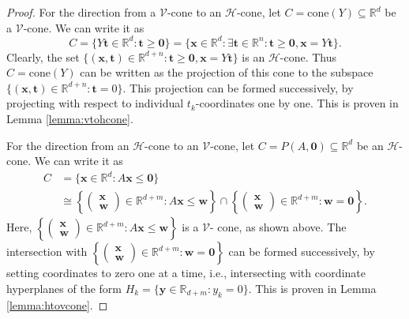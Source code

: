 		\begin{proof} 
			For the direction from a $\mathcal{V}$-cone to an $\mathcal{H}$-cone, 
			let $C = \text{cone} (Y) \subseteq \mathbb{R}^d$ be a $\mathcal{V}$-cone. 
			We can write it as 
			\[
				C = \{Y \boldsymbol{t} \in \mathbb{R}^d : \boldsymbol{t} \geq \boldsymbol{0} \}
				= \{ \boldsymbol{x} \in \mathbb{R}^d : \exists \boldsymbol{t} \in \mathbb{R}^n : 
				\boldsymbol{t} \geq \boldsymbol{0}, \boldsymbol{x} = Y\boldsymbol{t} \}.
			\]
			Clearly, the set $\{(\boldsymbol{x},\boldsymbol{t}) \in \mathbb{R}^{d+n} : 
			\boldsymbol{t} \geq \boldsymbol{0}, \boldsymbol{x} = Y\boldsymbol{t} \}$ is an 
			$\mathcal{H}$-cone. Thus $C = \text{cone}(Y)$ can be written as the projection 
			of this cone to the subspace $\{(\boldsymbol{x},\boldsymbol{t}) \in \mathbb{R}^{d+n} : 
			\boldsymbol{t} = 0 \}$. 
			This projection can be formed successively, by projecting with respect to individual 
			$t_k$-coordinates one by one. This is proven in Lemma \ref{lemma:vtohcone}. 
			
			For the direction from an $\mathcal{H}$-cone to an $\mathcal{V}$-cone, 
			let $C = P(A,\boldsymbol{0}) \subseteq \mathbb{R}^d$ be an $\mathcal{H}$-cone. 
			We can write it as 
			\begin{align*}
				C &= \{ \boldsymbol{x} \in \mathbb{R}^d : A\boldsymbol{x} \leq \boldsymbol{0} \} \\
				&\cong \left\{ \left(\substack{\boldsymbol{x} \\ \boldsymbol{w}} \right) \in 
				\mathbb{R}^{d+m} : A\boldsymbol{x} \leq \boldsymbol{w} \right\} \cap 
				\left\{ \left(\substack{\boldsymbol{x} \\ \boldsymbol{w}} \right) \in 
				\mathbb{R}^{d+m} : \boldsymbol{w} = \boldsymbol{0} \right\}.
			\end{align*}
			Here, $\left\{ \left(\substack{\boldsymbol{x} \\ \boldsymbol{w}} \right) \in 
			\mathbb{R}^{d+m} : A\boldsymbol{x} \leq \boldsymbol{w} \right\}$ is a $\mathcal{V}$-
			cone, as shown above. 
			The intersection with $\left\{ \left(\substack{\boldsymbol{x} \\ \boldsymbol{w}} 
			\right) \in \mathbb{R}^{d+m} : \boldsymbol{w} = \boldsymbol{0} \right\}$ can be 
			formed successively, by setting coordinates to zero one at a time, i.e., intersecting 
			with coordinate hyperplanes of the form $H_k = \{ \boldsymbol{y} \in \mathbb{R}_{d+m} 
			: y_k = 0 \}$. This is proven in Lemma \ref{lemma:htovcone}. 
		\end{proof}
		
